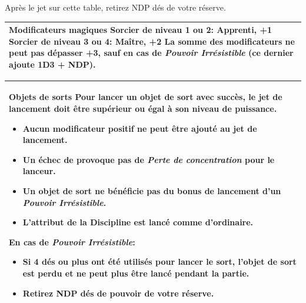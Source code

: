 \begin{table}[h!]
\begin{minipage}[t]{.5\linewidth}
\bigskip
Après le jet sur cette table, retirez NDP dés de votre réserve.
\smallskip

\begin{tabular}{|m{8cm}|}
\hline
\textbf{Modificateurs magiques}
\newline Sorcier de niveau 1 ou 2: Apprenti, +1
\newline Sorcier de niveau 3 ou 4: Maître, +2
\newline La somme des modificateurs ne peut pas dépasser +3, sauf en cas de \emph{Pouvoir Irrésistible} (ce dernier ajoute 1D3 + NDP). \tabularnewline
\hline
\end{tabular}

\bigskip

\begin{tabular}{|m{8cm}|}
\hline
\textbf{Objets de sorts}
\newline Pour lancer un objet de sort avec succès, le jet de lancement doit être supérieur ou égal à son niveau de puissance.
\smallskip
\begin{itemize}
\item Aucun modificateur positif ne peut être ajouté au jet de lancement.
\item Un échec de provoque pas de \emph{Perte de concentration} pour le lanceur.
\item Un objet de sort ne bénéficie pas du bonus de lancement d'un \emph{Pouvoir Irrésistible}.
\item L'attribut de la Discipline est lancé comme d'ordinaire.
\end{itemize}
En cas de \emph{Pouvoir Irrésistible}:
\begin{itemize}
\item Si 4 dés ou plus ont été utilisés pour lancer le sort, l'objet de sort est perdu et ne peut plus être lancé pendant la partie.
\item Retirez NDP dés de pouvoir de votre réserve.
\end{itemize}
\tabularnewline
\hline
\end{tabular}

\end{minipage}
\end{table}

